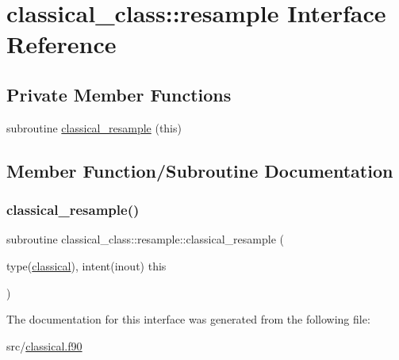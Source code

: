 \hypertarget{interfaceclassical__class_1_1resample}{}\section{classical\+\_\+class\+:\+:resample Interface Reference}
\label{interfaceclassical__class_1_1resample}
\subsection*{Private Member Functions}
\begin{DoxyCompactItemize}
\item 
subroutine \hyperlink{interfaceclassical__class_1_1resample_ad87fc3bae1d4818d7f1754f77119539c}{classical\+\_\+resample} (this)
\end{DoxyCompactItemize}


\subsection{Member Function/\+Subroutine Documentation}
\mbox{\label{interfaceclassical__class_1_1resample_ad87fc3bae1d4818d7f1754f77119539c}} 
\subsubsection{\texorpdfstring{classical\+\_\+resample()}{classical\_resample()}}
{\footnotesize\ttfamily subroutine classical\+\_\+class\+::resample\+::classical\+\_\+resample (\begin{DoxyParamCaption}\item[{type(\hyperlink{structclassical__class_1_1classical}{classical}), intent(inout)}]{this }\end{DoxyParamCaption})\hspace{0.3cm}{\ttfamily [private]}}



The documentation for this interface was generated from the following file\+:\begin{DoxyCompactItemize}
\item 
src/\hyperlink{classical_8f90}{classical.\+f90}\end{DoxyCompactItemize}

